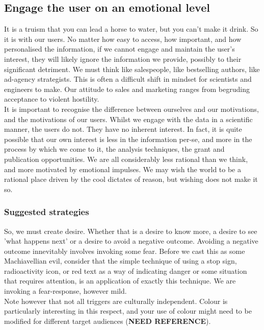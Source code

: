 \subsection{Engage the user on an emotional level}
It is a truism that you can lead a horse to water, but you can't make it drink. So it is with our users.
No matter how easy to access, how important, and how personalised the information, if we cannot engage and maintain the user's interest,
they will likely ignore the information we provide, possibly to their significant detriment.
We must think like salespeople, like bestselling authors, like ad-agency strategists.
This is often a difficult shift in mindset for scientists and engineers to make.
Our attitude to sales and marketing ranges from begruding acceptance to violent hostility. \\

It is important to recognise the difference between ourselves and our motivations, and the motivations of our users. Whilst we engage with the data in a scientific
manner, the users do not. They have no inherent interest. In fact, it is quite possible that our own interest is less in the information per-se, and more in the process
by which we come to it, the analysis techniques, the grant and publication opportunities. We are all considerably less rational than we think, and more motivated by
emotional impulses. We may wish the world to be a rational place driven by the cool dictates of reason, but wishing does not make it so. \\

\subsubsection*{Suggested strategies}

So, we must create desire. Whether that is a desire to know more, a desire to see 'what happens next' or a desire to avoid a negative outcome.
Avoiding a negative outcome innevitably involves invoking some fear. Before we cast this as some Machiavellian evil, consider that the simple
technique of using a stop sign, radioactivity icon, or red text as a way of indicating danger or some situation that requires attention, is an
application of exactly this technique. We are invoking a fear-response, however mild. \\

Note however that not all triggers are culturally independent. Colour is particularly interesting in this respect, and your use of colour might
need to be modified for different target audiences (\textbf{NEED REFERENCE}). \\

